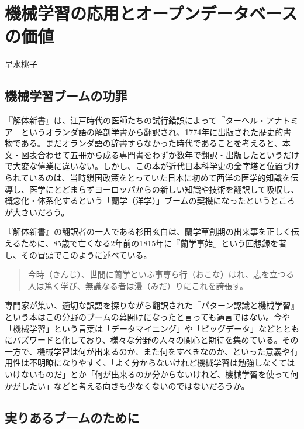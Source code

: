 
\chapter{機械学習の応用とオープンデータベースの価値}

\begin{flushright}
 早水桃子 %
\end{flushright}

\section{機械学習ブームの功罪}

『解体新書』は、江戸時代の医師たちの試行錯誤によって『ターヘル・アナトミア』というオランダ語の解剖学書から翻訳され、1774年に出版された歴史的書物である。まだオランダ語の辞書すらなかった時代であることを考えると、本文・図表合わせて五冊から成る専門書をわずか数年で翻訳・出版したというだけで大変な偉業に違いない。しかし、この本が近代日本科学史の金字塔と位置づけられているのは、当時鎖国政策をとっていた日本に初めて西洋の医学的知識を伝導し、医学にとどまらずヨーロッパからの新しい知識や技術を翻訳して吸収し、概念化・体系化するという「蘭学（洋学）」ブームの契機になったというところが大きいだろう。

『解体新書』の翻訳者の一人である杉田玄白は、蘭学草創期の出来事を正しく伝えるために、85歳で亡くなる2年前の1815年に『蘭学事始』という回想録を著し、その冒頭でこのように述べている。

\begin{quote}
今時（きんじ）、世間に蘭学といふ事専ら行（おこな）はれ、志を立つる人は篤く学び、無識なる者は漫（みだ）りにこれを誇張す。
\end{quote}

専門家が集い、適切な訳語を探りながら翻訳された『パターン認識と機械学習』という本はこの分野のブームの幕開けになったと言っても過言ではない。今や「機械学習」という言葉は「データマイニング」や「ビッグデータ」などとともにバズワードと化しており、様々な分野の人々の関心と期待を集めている。その一方で、機械学習は何が出来るのか、また何をすべきなのか、といった意義や有用性は不明瞭になりやすく、「よく分からないけれど機械学習は勉強しなくてはいけないものだ」とか「何が出来るのか分からないけれど、機械学習を使って何かがしたい」などと考える向きも少なくないのではないだろうか。

\section{実りあるブームのために}
